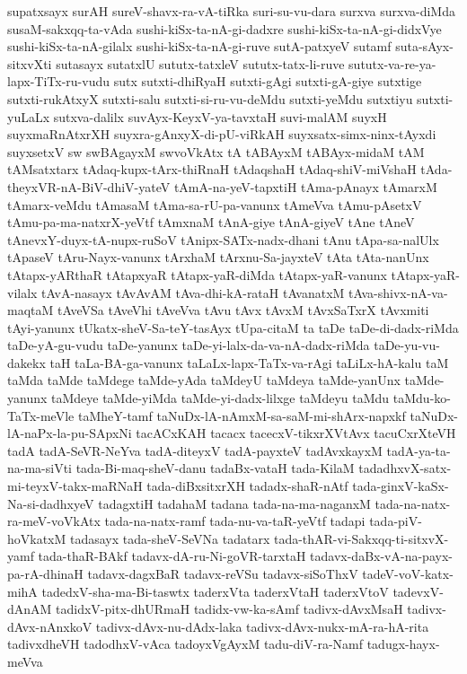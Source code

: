 {supatxsayx
surAH
sureV-shavx-ra-vA-tiRka
suri-su-vu-dara
surxva
surxva-diMda
susaM-sakxqq-ta-vAda
sushi-kiSx-ta-nA-gi-dadxre
sushi-kiSx-ta-nA-gi-didxVye
sushi-kiSx-ta-nA-gilalx
sushi-kiSx-ta-nA-gi-ruve
sutA-patxyeV
sutamf
suta-sAyx-sitxvXti
sutasayx
sutatxlU
sututx-tatxleV
sututx-tatx-li-ruve
sututx-va-re-ya-lapx-TiTx-ru-vudu
sutx
sutxti-dhiRyaH
sutxti-gAgi
sutxti-gA-giye
sutxtige
sutxti-rukAtxyX
sutxti-salu
sutxti-si-ru-vu-deMdu
sutxti-yeMdu
sutxtiyu
sutxti-yuLaLx
sutxva-dalilx
suvAyx-KeyxV-ya-tavxtaH
suvi-malAM
suyxH
suyxmaRnAtxrXH
suyxra-gAnxyX-di-pU-viRkAH
suyxsatx-simx-ninx-tAyxdi
suyxsetxV
sw
swBAgayxM
swvoVkAtx
tA
tABAyxM
tABAyx-midaM
tAM
tAMsatxtarx
tAdaq-kupx-tArx-thiRnaH
tAdaqshaH
tAdaq-shiV-miVshaH
tAda-theyxVR-nA-BiV-dhiV-yateV
tAmA-na-yeV-tapxtiH
tAma-pAnayx
tAmarxM
tAmarx-veMdu
tAmasaM
tAma-sa-rU-pa-vanunx
tAmeVva
tAmu-pAsetxV
tAmu-pa-ma-natxrX-yeVtf
tAmxnaM
tAnA-giye
tAnA-giyeV
tAne
tAneV
tAnevxY-duyx-tA-nupx-ruSoV
tAnipx-SATx-nadx-dhani
tAnu
tApa-sa-nalUlx
tApaseV
tAru-Nayx-vanunx
tArxhaM
tArxnu-Sa-jayxteV
tAta
tAta-nanUnx
tAtapx-yARthaR
tAtapxyaR
tAtapx-yaR-diMda
tAtapx-yaR-vanunx
tAtapx-yaR-vilalx
tAvA-nasayx
tAvAvAM
tAva-dhi-kA-rataH
tAvanatxM
tAva-shivx-nA-va-maqtaM
tAveVSa
tAveVhi
tAveVva
tAvu
tAvx
tAvxM
tAvxSaTxrX
tAvxmiti
tAyi-yanunx
tUkatx-sheV-Sa-teY-tasAyx
tUpa-citaM
ta
taDe
taDe-di-dadx-riMda
taDe-yA-gu-vudu
taDe-yanunx
taDe-yi-lalx-da-va-nA-dadx-riMda
taDe-yu-vu-dakekx
taH
taLa-BA-ga-vanunx
taLaLx-lapx-TaTx-va-rAgi
taLiLx-hA-kalu
taM
taMda
taMde
taMdege
taMde-yAda
taMdeyU
taMdeya
taMde-yanUnx
taMde-yanunx
taMdeye
taMde-yiMda
taMde-yi-dadx-lilxge
taMdeyu
taMdu
taMdu-ko-TaTx-meVle
taMheY-tamf
taNuDx-lA-nAmxM-sa-saM-mi-shArx-napxkf
taNuDx-lA-naPx-la-pu-SApxNi
tacACxKAH
tacacx
tacecxV-tikxrXVtAvx
tacuCxrXteVH
tadA
tadA-SeVR-NeYva
tadA-diteyxV
tadA-payxteV
tadAvxkayxM
tadA-ya-ta-na-ma-siVti
tada-Bi-maq-sheV-danu
tadaBx-vataH
tada-KilaM
tadadhxvX-satx-mi-teyxV-takx-maRNaH
tada-diBxsitxrXH
tadadx-shaR-nAtf
tada-ginxV-kaSx-Na-si-dadhxyeV
tadagxtiH
tadahaM
tadana
tada-na-ma-naganxM
tada-na-natx-ra-meV-voVkAtx
tada-na-natx-ramf
tada-nu-va-taR-yeVtf
tadapi
tada-piV-hoVkatxM
tadasayx
tada-sheV-SeVNa
tadatarx
tada-thAR-vi-Sakxqq-ti-sitxvX-yamf
tada-thaR-BAkf
tadavx-dA-ru-Ni-goVR-tarxtaH
tadavx-daBx-vA-na-payx-pa-rA-dhinaH
tadavx-dagxBaR
tadavx-reVSu
tadavx-siSoThxV
tadeV-voV-katx-mihA
tadedxV-sha-ma-Bi-taswtx
taderxVta
taderxVtaH
taderxVtoV
tadevxV-dAnAM
tadidxV-pitx-dhURmaH
tadidx-vw-ka-sAmf
tadivx-dAvxMsaH
tadivx-dAvx-nAnxkoV
tadivx-dAvx-nu-dAdx-laka
tadivx-dAvx-nukx-mA-ra-hA-rita
tadivxdheVH
tadodhxV-vAca
tadoyxVgAyxM
tadu-diV-ra-Namf
tadugx-hayx-meVva
}
